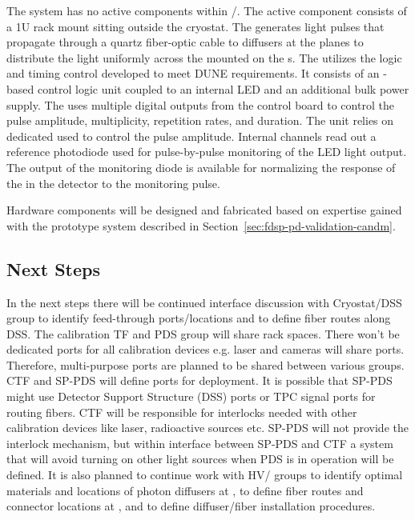 The system has no active components within /. 
 The active %
component consists of a 1U rack mount
 sitting outside the cryostat. The  generates light pulses that propagate through a quartz fiber-optic cable to diffusers at the  planes to distribute the light uniformly across the  mounted on the s.
The  utilizes the logic and timing control developed to meet DUNE  requirements. It consists of an -based control logic unit coupled to an internal LED  and an additional bulk power supply. The  uses multiple digital outputs from the control board to control the  pulse
amplitude, multiplicity, repetition rates, and duration. The unit relies on dedicated  used to control the  pulse amplitude. Internal  channels %
read out a reference photodiode used for pulse-by-pulse monitoring of the LED light output. 
The output of the monitoring diode is available for normalizing the response of the  in the detector to the monitoring pulse.

Hardware components will be designed and fabricated based on expertise gained with the  prototype system described in Section~\ref{sec:fdsp-pd-validation-candm}.

\subsection{Next Steps}

In the next steps there will be continued interface discussion with Cryostat/DSS group to identify feed-through ports/locations and to define fiber routes along DSS. The calibration TF and PDS group will share rack spaces. There won't be dedicated ports for all calibration devices e.g. laser and cameras will share ports. 
Therefore, multi-purpose ports are planned to be shared between various groups. CTF and SP-PDS will define ports for deployment. It is possible that SP-PDS might use Detector Support Structure (DSS) ports or TPC signal ports for routing fibers. CTF will be responsible for interlocks needed with other calibration devices 
like laser, radioactive sources etc. SP-PDS will not provide the interlock mechanism, but within interface between SP-PDS and CTF a system that will avoid turning  on other light sources when PDS is in operation will be defined.
It is also planned to continue work with HV/ groups to identify optimal materials and locations of photon diffusers at , to define fiber routes and connector locations  at , and to define diffuser/fiber installation procedures.

